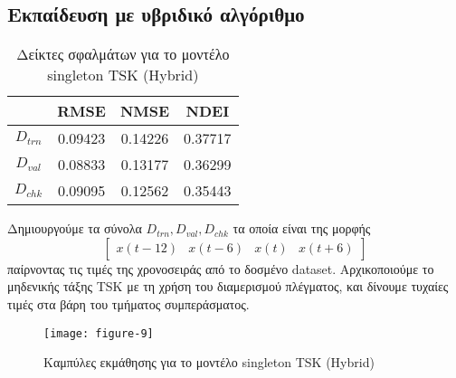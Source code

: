 \documentclass[11pt,a4paper,titlepage, oneside]{article}
\newlength\figureheight
\newlength\figurewidth
\begin{document}
		\subsection{Εκπαίδευση με υβριδικό αλγόριθμο}
			\begin{wraptable}{r}{0.5\textwidth}
				\vspace{-7pt}
				\centering
				\begin{tabular}{c | c c c}
					 & \bfseries{RMSE} & \bfseries{NMSE} & \bfseries{NDEI} \\ \hline{}
					 $D_{trn}$ & 0.09423 & 0.14226 & 0.37717 \\ \hline
					 $D_{val}$ & 0.08833 & 0.13177 & 0.36299 \\ \hline
					 $D_{chk}$ & 0.09095 & 0.12562 & 0.35443 \\ 
				\end{tabular}
				\caption{Δείκτες σφαλμάτων για το μοντέλο singleton TSK (Hybrid)}
				\label{tab:singleton_hybrid_error_metrics}
			\end{wraptable}
			Δημιουργούμε τα σύνολα $D_{trn}, D_{val}, D_{chk}$ τα οποία είναι της μορφής 
			$$ \begin{bmatrix} x(t-12) & x(t-6) & x(t) & x(t+6) \end{bmatrix} $$
			παίρνοντας τις τιμές της χρονοσειράς από το δοσμένο dataset. Αρχικοποιούμε το μηδενικής τάξης TSK με τη χρήση του διαμερισμού πλέγματος, και δίνουμε τυχαίες τιμές στα βάρη του τμήματος συμπεράσματος.\\
						
			\begin{wrapfigure}{r}{0.5\textwidth}
				\vspace{-42pt}
			 	\setlength{}
				\setlength{}	
				\centering
				\texttt{[image: figure-9]}
				\caption{Καμπύλες εκμάθησης για το μοντέλο singleton TSK (Hybrid)}
				\label{fig:singleton_hybrid_learning_curves}
				\vspace{-15pt}
			\end{wrapfigure}
			
\end{document}
